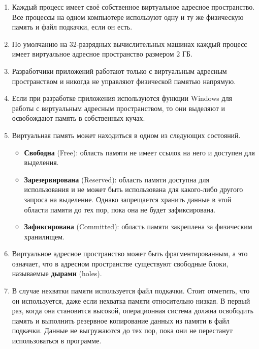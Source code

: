 \begin{enumerate}[label*=\arabic*.]
	\item Каждый процесс имеет своё собственное виртуальное адресное пространство. Все процессы на одном компьютере используют одну и ту же физическую память и файл подкачки, если он есть.
	
	\item По умолчанию на 32-разрядных вычислительных машинах каждый процесс имеет виртуальное адресное пространство размером 2 ГБ.
	
	\item Разработчики приложений работают только с виртуальным адресным пространством и никогда не управляют физической памятью напрямую.
	
	\item Если при разработке приложения используются функции Windows для работы с виртуальным адресным пространством, то они выделяют и освобождают память в собственных кучах.
	
	\item Виртуальная память может находиться в одном из следующих состояний.
	\begin{itemize}[label*=---]
		\item \textbf{Свободна} (Free): область памяти не имеет ссылок на него и доступен для выделения.
		\item \textbf{Зарезервирована} (Reserved): область памяти доступна для использования и не может быть использована для какого-либо другого запроса на выделение. Однако запрещается хранить данные в этой области памяти до тех пор, пока она не будет зафиксирована.
		\item \textbf{Зафиксирована} (Committed): область памяти закреплена за физическим хранилищем.
	\end{itemize}
	
	\item Виртуальное адресное пространство может быть фрагментированным, а это означает, что в адресном пространстве существуют свободные блоки, называемые \textbf{дырами} (holes).
	
	\item В случае нехватки памяти используется файл подкачки. Стоит отметить, что он используется, даже если нехватка памяти относительно низкая. В первый раз, когда она становится высокой, операционная система должна освободить память и выполнить резервное копирование данных из памяти в файл подкачки. Данные не выгружаются до тех пор, пока они не перестанут использоваться в программе.
\end{enumerate}

